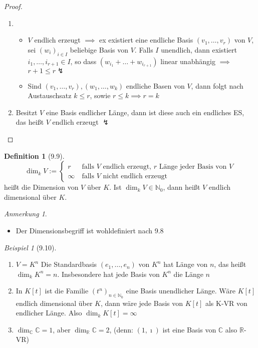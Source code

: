 \documentclass[a4paper]{scrartcl}
\theoremstyle{definition}
\newtheorem{defn}{Definition}
\theoremstyle{plain}
\theoremstyle{plain}
\theoremstyle{remark}
\theoremstyle{remark}
\newtheorem{note}{Anmerkung}
\theoremstyle{remark}
\theoremstyle{remark}
\theoremstyle{remark}
\newtheorem{ex}{Beispiel}
\newcommand{\I}{\ensuremath{\imath}}%
\begin{document}
\begin{proof}
\begin{enumerate}
\item \begin{itemize}
\item $V$ endlich erzeugt $\implies$ ex existiert eine endliche Basis $(v_1, \ldots, v_r)$ von $V$, sei $(w_i)_{i\in I}$ beliebige Basis von $V$. Falls $I$ unendlich, dann existiert $i_1, \ldots, i_{r + 1} \in I$, so dass $(w_{i_1} + \ldots + w_{i_{r + 1}})$
        linear unabhängig $\implies$ $r + 1 \leq r \lightning$
\item Sind $(v_1, \ldots, v_r), (w_1, \ldots, w_k)$ endliche Basen von $V$, dann folgt nach Austauschsatz $k \leq r$, sowie $r\leq k \implies r = k$
\end{itemize}
\item Besitzt $V$ eine Basis endlicher Länge, dann ist diese auch ein endliches ES, das heißt $V$ endlich erzeugt $\lightning$
\end{enumerate}
\end{proof}
\begin{defn}[9.9]
\[\dim_k V := \begin{cases} r & ~\text{falls $V$ endlich erzeugt, $r$ Länge jeder Basis von $V$} \\ \infty & ~\text{falls $V$ nicht endlich erzeugt}\end{cases}\]
heißt die Dimension von $V$ über $K$. Ist $\dim_k V\in\mathbb{N}_0$, dann heißt $V$ endlich dimensional über $K$.
\end{defn}
\begin{note}
\begin{itemize}
\item Der Dimensionsbegriff ist wohldefiniert nach 9.8
\end{itemize}
\end{note}
\begin{ex}[9.10]
\begin{enumerate}
\item $V = K^n$ Die Standardbasis $(e_1, \ldots, e_n)$ von $K^n$ hat Länge von $n$, das heißt $\dim_k K^n = n$. Insbesondere hat jede Basis von $K^n$ die Länge $n$
\item In $K[t]$ ist die Familie $(t^n)_{n\in\mathbb{N}_0}$ eine Basis unendlicher Länge. Wäre $K[t]$ endlich dimensional über $K$, dann wäre jede Basis von $K[t]$ als K-VR von endlicher Länge. Also $\dim_k K[t] = \infty$
\item $\dim_\mathbb{C} \mathbb{C} = 1$, aber $\dim_\mathbb{R} \mathbb{C} = 2$, (denn: $(1,\I)$ ist eine Basis von $\mathbb{C}$ also $\mathbb{R}$-VR)
\end{enumerate}
\end{ex}
\end{document}
